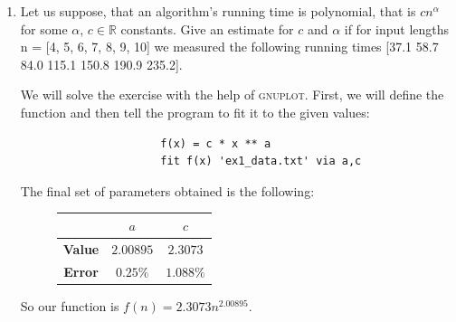 \documentclass[12pt,english]{article}
\newenvironment{statement}{\fontfamily{ptm}\selectfont}{\par}
\begin{document}
\begin{enumerate}

	\item
		\begin{statement}
			Let us suppose, that an algorithm’s running time is polynomial, that is $cn^\alpha$ for some $\alpha$, $c \in \mathbb{R}$ constants. Give an estimate for
			$c$ and $\alpha$ if for input lengths n = [4, 5, 6, 7, 8, 9, 10] we measured the following running times [37.1 58.7 84.0 115.1 150.8 190.9 235.2].
		\end{statement}

		We will solve the exercise with the help of \textsc{gnuplot}. First, we will define the function and then tell the program to fit it to the given values:
		\begin{figure}[H]
			\centering
			\begin{verbatim}
				f(x) = c * x ** a
				fit f(x) 'ex1_data.txt' via a,c
			\end{verbatim}
		\end{figure}
		The final set of parameters obtained is the following:
		\begin{figure}[H]
			\centering
			\begin{tabular}{|c|c|c|}
				\hline
				 & $a$ & $c$ \\
				 \hline
				 \textbf{Value} & $2.00895$ & $2.3073$ \\
				 \hline
				 \textbf{Error} & $0.25\%$ & $1.088\%$ \\
				 \hline
			\end{tabular}
		\end{figure}

		So our function is $f(n) = 2.3073n^{2.00895}$.


\end{enumerate}
\end{document}
